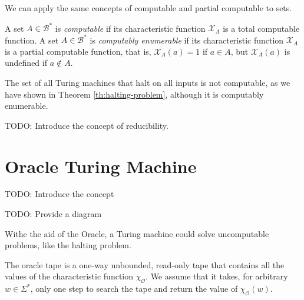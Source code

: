 We can apply the same concepts of computable and partial computable to sets.

\begin{definition}
A set $A \in \mathcal{B}^\ast$ is \emph{computable} if its characteristic function $\mathcal{X}_A$ is a total computable function. A set $A \in \mathcal{B}^\ast$ is \emph{computably enumerable} if its characteristic function $\mathcal{X}_A$ is a partial computable function, that is, $\mathcal{X}_A(a) = 1$ if $a \in A$, but $\mathcal{X}_A(a)$ is undefined if $a \not\in A$.
\end{definition}

\begin{example}
The set of all Turing machines that halt on all inputs is not computable, as we have shown in Theorem \ref{th:halting-problem}, although it is computably enumerable.
\end{example}

{\color{red} TODO: Introduce the concept of reducibility.}

%
%

\section{Oracle Turing Machine}
\label{sec:oracle_turing_machine}

{\color{red} TODO: Introduce the concept}

{\color{red} TODO: Provide a diagram}

Withe the aid of the Oracle, a Turing machine could solve uncomputable problems, like the halting problem.

{\color{red} The oracle tape is a one-way unbounded, read-only tape that contains all the values of the characteristic function $\chi_\mathcal{O}$. We assume that it takes, for arbitrary $w \in \Sigma^\ast$, only one step to search the tape and return the value of $\chi_\mathcal{O}(w)$.}

